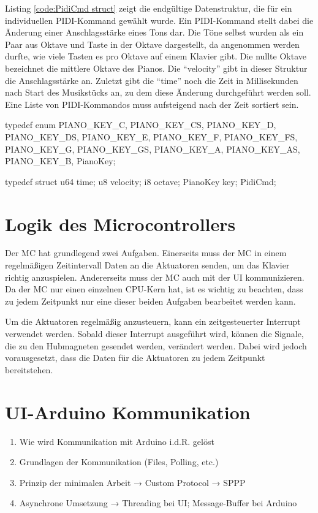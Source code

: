 Listing \ref{code:PidiCmd struct} zeigt die endgültige Datenstruktur, die für ein individuellen \ac{PIDI}-Kommand gewählt wurde.
Ein \ac{PIDI}-Kommand stellt dabei die Änderung einer Anschlagsstärke eines Tons dar.
Die Töne selbst wurden als ein Paar aus Oktave und Taste in der Oktave dargestellt, da angenommen werden durfte, wie viele Tasten es pro Oktave auf einem Klavier gibt.
Die nullte Oktave bezeichnet die mittlere Oktave des Pianos.
Die \enquote{velocity} gibt in dieser Struktur die Anschlagsstärke an.
Zuletzt gibt die \enquote{time} noch die Zeit in Millisekunden nach Start des Musikstücks an, zu dem diese Änderung durchgeführt werden soll.
Eine Liste von \ac{PIDI}-Kommandos muss aufsteigend nach der Zeit sortiert sein.

\begin{UnbrokenCodePage}[style=CStyle, caption={Definition eines \ac{PIDI}-Kommands}, label={code:PidiCmd struct}]
typedef enum {
    PIANO_KEY_C,
    PIANO_KEY_CS,
    PIANO_KEY_D,
    PIANO_KEY_DS,
    PIANO_KEY_E,
    PIANO_KEY_F,
    PIANO_KEY_FS,
    PIANO_KEY_G,
    PIANO_KEY_GS,
    PIANO_KEY_A,
    PIANO_KEY_AS,
    PIANO_KEY_B,
} PianoKey;

typedef struct {
    u64  time;
    u8   velocity;
    i8   octave;
    PianoKey key;
} PidiCmd;
\end{UnbrokenCodePage}

\section{Logik des Microcontrollers} \label{vorgehenSW-MC}

Der \ac{MC} hat grundlegend zwei Aufgaben.
Einerseits muss der \ac{MC} in einem regelmäßigen Zeitintervall Daten an die Aktuatoren senden, um das Klavier richtig anzuspielen.
Andererseits muss der \ac{MC} auch mit der \ac{UI} kommunizieren.
Da der \ac{MC} nur einen einzelnen CPU-Kern hat, ist es wichtig zu beachten, dass zu jedem Zeitpunkt nur eine dieser beiden Aufgaben bearbeitet werden kann.

Um die Aktuatoren regelmäßig anzusteuern, kann ein zeitgesteuerter Interrupt verwendet werden.
Sobald dieser Interrupt ausgeführt wird, können die Signale, die zu den Hubmagneten gesendet werden, verändert werden. %
Dabei wird jedoch vorausgesetzt, dass die Daten für die Aktuatoren zu jedem Zeitpunkt bereitstehen.


\section{UI-Arduino Kommunikation} \label{vorgehenSW-SPPP}
\begin{enumerate}
    \item Wie wird Kommunikation mit Arduino i.d.R. gelöst
    \item Grundlagen der Kommunikation (Files, Polling, etc.)
    \item Prinzip der minimalen Arbeit → Custom Protocol → SPPP
    \item Asynchrone Umsetzung → Threading bei UI; Message-Buffer bei Arduino
\end{enumerate}

